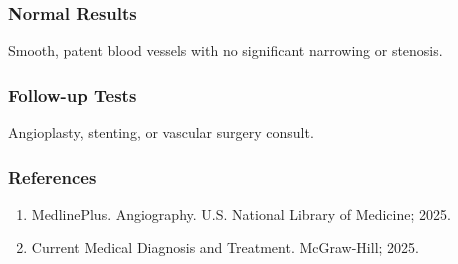 \subsubsection*{Normal Results}
Smooth, patent blood vessels with no significant narrowing or stenosis.

\subsubsection*{Follow-up Tests}
Angioplasty, stenting, or vascular surgery consult.

\subsubsection*{References}
\begin{enumerate}
  \item MedlinePlus. Angiography. U.S. National Library of Medicine; 2025.
  \item Current Medical Diagnosis and Treatment. McGraw-Hill; 2025.
\end{enumerate}

\clearpage
